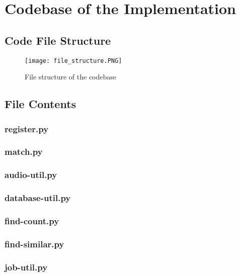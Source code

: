 \chapter{Codebase of the Implementation}

\section{Code File Structure}

\begin{figure}[H]
    \centering
    \texttt{[image: file\_structure.PNG]}
    \caption{File structure of the codebase}
    \label{fig:file_codebase}
  \end{figure}

\section{File Contents}

\subsection{register.py}

\subsection{match.py}

\subsection{audio-util.py}

\subsection{database-util.py}

\subsection{find-count.py}

\subsection{find-similar.py}

\subsection{job-util.py}

